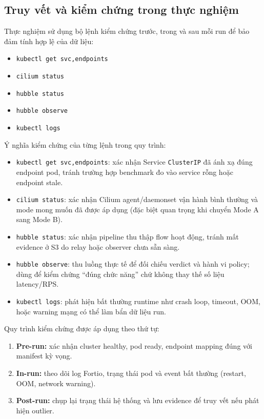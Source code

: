 \subsection{Truy vết và kiểm chứng trong thực nghiệm}
Thực nghiệm sử dụng bộ lệnh kiểm chứng trước, trong và sau mỗi run để bảo đảm tính hợp lệ của dữ liệu:
\begin{itemize}
  \item \texttt{kubectl get svc,endpoints}
  \item \texttt{cilium status}
  \item \texttt{hubble status}
  \item \texttt{hubble observe}
  \item \texttt{kubectl logs}
\end{itemize}

Ý nghĩa kiểm chứng của từng lệnh trong quy trình:
\begin{itemize}
  \item \texttt{kubectl get svc,endpoints}: xác nhận Service \texttt{ClusterIP} đã ánh xạ đúng endpoint pod, tránh trường hợp benchmark đo vào service rỗng hoặc endpoint stale.
  \item \texttt{cilium status}: xác nhận Cilium agent/daemonset vận hành bình thường và mode mong muốn đã được áp dụng (đặc biệt quan trọng khi chuyển Mode A sang Mode B).
  \item \texttt{hubble status}: xác nhận pipeline thu thập flow hoạt động, tránh mất evidence ở S3 do relay hoặc observer chưa sẵn sàng.
  \item \texttt{hubble observe}: thu luồng thực tế để đối chiếu verdict và hành vi policy; dùng để kiểm chứng ``đúng chức năng'' chứ không thay thế số liệu latency/RPS.
  \item \texttt{kubectl logs}: phát hiện bất thường runtime như crash loop, timeout, OOM, hoặc warning mạng có thể làm bẩn dữ liệu run.
\end{itemize}

Quy trình kiểm chứng được áp dụng theo thứ tự:
\begin{enumerate}
  \item \textbf{Pre-run:} xác nhận cluster healthy, pod ready, endpoint mapping đúng với manifest kỳ vọng.
  \item \textbf{In-run:} theo dõi log Fortio, trạng thái pod và event bất thường (restart, OOM, network warning).
  \item \textbf{Post-run:} chụp lại trạng thái hệ thống và lưu evidence để truy vết nếu phát hiện outlier.
\end{enumerate}

